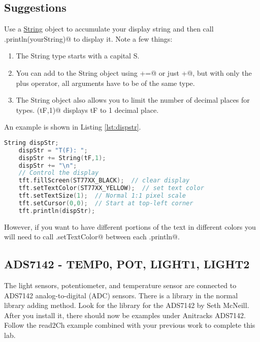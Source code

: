 \subsection{Suggestions}
Use a \href{https://www.arduino.cc/reference/en/language/variables/data-types/stringobject/}{String} 
object to accumulate your display string and then call \lstinline@display.println(yourString)@ 
to display it. Note a few things:
\begin{enumerate}
	\item The String type starts with a capital S.
	\item You can add to the String object using \lstinline@+=@ or just \lstinline@+@, 
		but with only the plus operator, all arguments have to be of the same type. 
	\item The String object also allows you to limit the number of decimal places for \lstinline@float@ types.
            \lstinline@String(tF,1)@ displays tF to 1 decimal place.
\end{enumerate}
An example is shown in Listing \ref{lst:dispstr}.
\begin{lstlisting}[caption={This is an example of using a String 
		object to display text and float variables. The floats are 
		limited to 1 decimal place such that 7.123 would be displayed as 7.1.},
		label={lst:dispstr},language=C++]
	String dispStr;
	dispStr = "T(F): ";
	dispStr += String(tF,1);
	dispStr += "\n";
	// Control the display  
	tft.fillScreen(ST77XX_BLACK);  // clear display
	tft.setTextColor(ST77XX_YELLOW);  // set text color
	tft.setTextSize(1);  // Normal 1:1 pixel scale
	tft.setCursor(0,0);  // Start at top-left corner
	tft.println(dispStr);
\end{lstlisting}
However, if you want to have different portions of the text in different colors you will
need to call \lstinline@tft.setTextColor@ between each \lstinline@tft.println@.

\subsection{ADS7142 - TEMP0, POT, LIGHT1, LIGHT2}
The light sensors, potentiometer, and temperature sensor are connected to ADS7142 
analog-to-digital (ADC) sensors. There is a library in the normal library adding 
method. Look for the library for the ADS7142 by Seth McNeill. After you install it,
there should now be examples under Anitracks ADS7142. Follow the read2Ch example 
combined with your previous work to complete this lab.

